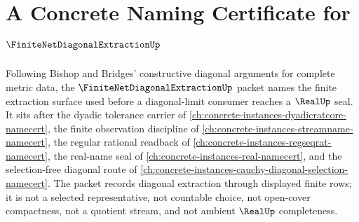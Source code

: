 \chapter{A Concrete Naming Certificate for $\FiniteNetDiagonalExtractionUp$}
\label{ch:concrete-instances-finite-net-diagonal-extraction-namecert}

Following Bishop and Bridges' constructive diagonal arguments for complete
metric data, the $\FiniteNetDiagonalExtractionUp$ packet names the finite
extraction surface used before a diagonal-limit consumer reaches a $\RealUp$
seal. It sits after the dyadic tolerance carrier of
\autoref{ch:concrete-instances-dyadicratcore-namecert}, the finite observation
discipline of \autoref{ch:concrete-instances-streamname-namecert}, the regular
rational readback of \autoref{ch:concrete-instances-regseqrat-namecert}, the
real-name seal of \autoref{ch:concrete-instances-real-namecert}, and the
selection-free diagonal route of
\autoref{ch:concrete-instances-cauchy-diagonal-selection-namecert}. The packet
records diagonal extraction through displayed finite rows; it is not a
selected representative, not countable choice, not open-cover compactness, not
a quotient stream, and not ambient $\RealUp$ completeness.

